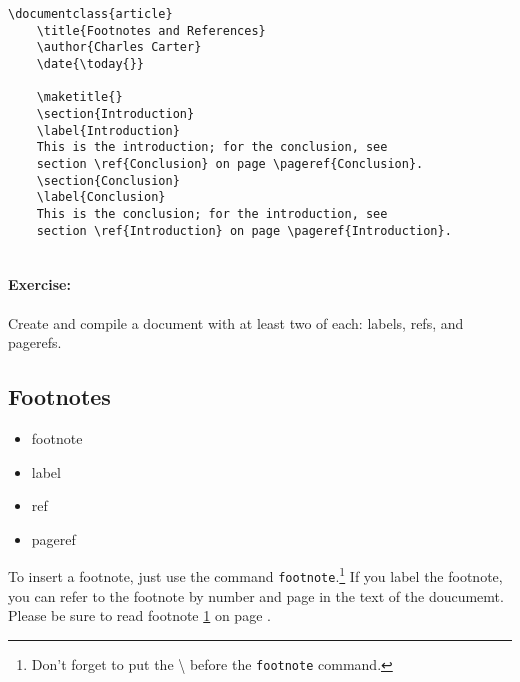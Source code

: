         \begin{verbatim}
\documentclass{article}
    \title{Footnotes and References}
    \author{Charles Carter}
    \date{\today{}}
 
    \maketitle{}
    \section{Introduction}
    \label{Introduction}
    This is the introduction; for the conclusion, see 
    section \ref{Conclusion} on page \pageref{Conclusion}.
    \section{Conclusion}
    \label{Conclusion}
    This is the conclusion; for the introduction, see 
    section \ref{Introduction} on page \pageref{Introduction}.
    

        \end{verbatim}

        \paragraph{Exercise:} Create and compile a document with at least two of each: labels, refs, and pagerefs.

    \subsection{Footnotes}
    \label{Footnotes}

        \begin{framed}
            \begin{itemize}
                \item{footnote}
                \item{label}
                \item{ref}
                \item{pageref}
            \end{itemize}
        \end{framed}

    To insert a footnote, just use the command \texttt{footnote}.\footnote{\label{references:fn}Don't forget to put the \textbackslash{} before the \texttt{footnote} command.} If you label the footnote, you can refer to the footnote by number and page in the text of the doucumemt. Please be sure to read footnote \ref{references:fn} on page \pageref{references:fn}.

